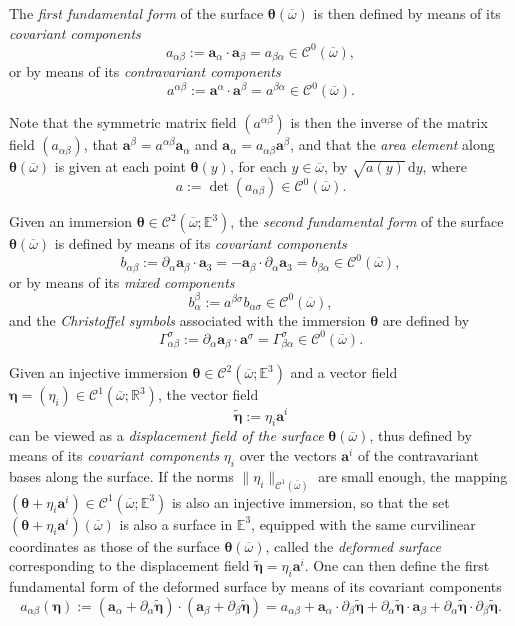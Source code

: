 \documentclass{amsart}
\def\dd{\, \mathrm{d}}
\begin{document}
The \emph{first fundamental form} of the surface $\bm{\theta} (\overline{\omega})$ is then defined by means of its \emph{covariant components}
$$
a_{\alpha\beta} := \bm{a}_\alpha \cdot \bm{a}_\beta = a_{\beta\alpha} \in \mathcal{C}^0(\overline{\omega}),
$$
or by means of its \emph{contravariant components}
$$
a^{\alpha\beta}:= \bm{a}^\alpha \cdot \bm{a}^\beta = a^{\beta\alpha}\in \mathcal{C}^0(\overline{\omega}).
$$

Note that the symmetric matrix field $(a^{\alpha\beta})$ is then the inverse of the matrix field $(a_{\alpha\beta})$, that $\bm{a}^\beta = a^{\alpha\beta}\bm{a}_\alpha$ and $\bm{a}_\alpha = a_{\alpha\beta} \bm{a}^\beta$, and that the \emph{area element} along $\bm{\theta}(\overline{\omega})$ is given at each point $\bm{\theta}(y)$, for each $y \in \overline{\omega}$, by $\sqrt{a(y)}\dd y$, where
$$
a := \det(a_{\alpha\beta}) \in \mathcal{C}^0(\overline{\omega}).
$$

Given an immersion $\bm{\theta} \in \mathcal{C}^2(\overline{\omega}; \mathbb{E}^3)$, the \emph{second fundamental form} of the surface $\bm{\theta}(\overline{\omega})$ is defined by means of its \emph{covariant components}
$$
b_{\alpha\beta}:= \partial_\alpha \bm{a}_\beta \cdot \bm{a}_3 = -\bm{a}_\beta \cdot \partial_\alpha \bm{a}_3 = b_{\beta\alpha} \in \mathcal{C}^0(\overline{\omega}),
$$
or by means of its \emph{mixed components}
$$
b^\beta_\alpha := a^{\beta\sigma} b_{\alpha \sigma} \in \mathcal{C}^0(\overline{\omega}),
$$
and the \emph{Christoffel symbols} associated with the immersion $\bm{\theta}$ are defined by
$$
\Gamma^\sigma_{\alpha\beta}:= \partial_\alpha \bm{a}_\beta \cdot \bm{a}^\sigma = \Gamma^\sigma_{\beta\alpha} \in \mathcal{C}^0(\overline{\omega}).
$$

Given an injective immersion $\bm{\theta} \in \mathcal{C}^2 (\overline{\omega}; \mathbb{E}^3)$ and a vector field $\bm{\eta} = (\eta_i) \in \mathcal{C}^1(\overline{\omega};\mathbb{R}^3)$, the vector field
$$
\tilde{\bm{\eta}} := \eta_i \bm{a}^i
$$
can be viewed as a \emph{displacement field of the surface} $\bm{\theta}(\overline{\omega})$, thus defined by means of its \emph{covariant components} $\eta_i$ over the vectors $\bm{a}^i$ of the contravariant bases along the surface. If the norms $\|\eta_i\|_{\mathcal{C}^1(\overline{\omega})}$ are small enough, the mapping $(\bm{\theta} + \eta_i \bm{a}^i) \in \mathcal{C}^1(\overline{\omega}; \mathbb{E}^3)$ is also an injective immersion, so that the set $(\bm{\theta} + \eta_i \bm{a}^i) (\overline{\omega})$ is also a surface in $\mathbb{E}^3$, equipped with the same curvilinear coordinates as those of the surface $\bm{\theta} (\overline{\omega})$, called the \emph{deformed surface} corresponding to the displacement field $\tilde{\bm{\eta}} = \eta_i \bm{a}^i$. One can then define the first fundamental form of the deformed surface by means of its covariant components
$$
a_{\alpha\beta}(\bm{\eta}):= (\bm{a}_\alpha + \partial_\alpha \tilde{\bm{\eta}}) \cdot (\bm{a}_\beta + \partial_\beta \tilde{\bm{\eta}})= a_{\alpha\beta} + \bm{a}_\alpha \cdot \partial_\beta \tilde{\bm{\eta}} + \partial_\alpha \tilde{\bm{\eta}} \cdot \bm{a}_\beta + \partial_\alpha \tilde{\bm{\eta}} \cdot \partial_\beta \tilde{\bm{\eta}}.
$$
\end{document}
